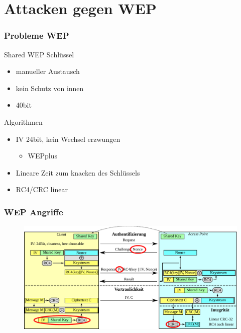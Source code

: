 \documentclass{beamer}
\begin{document}
\section{Attacken gegen WEP}
\begin{frame}
\frametitle{Probleme WEP}
\begin{block}{Shared WEP Schlüssel}
\begin{itemize}
	\item manueller Austausch
	\item kein Schutz von innen
	\item 40bit
\end{itemize}
\end{block}
\begin{block}{Algorithmen}
\begin{itemize}
	\item IV 24bit, kein Wechsel erzwungen
	\begin{itemize}
		\item WEPplus
	\end{itemize}
	\item Lineare Zeit zum knacken des Schlüssels
	\item RC4/CRC linear
\end{itemize}
\end{block}
\end{frame}

\begin{frame}
\frametitle{WEP Angriffe}
\begin{figure}
	\includegraphics[width=1.0\linewidth]{figures/WEP_complete_attacks.pdf}
\end{figure}
\end{frame}
\end{document}

